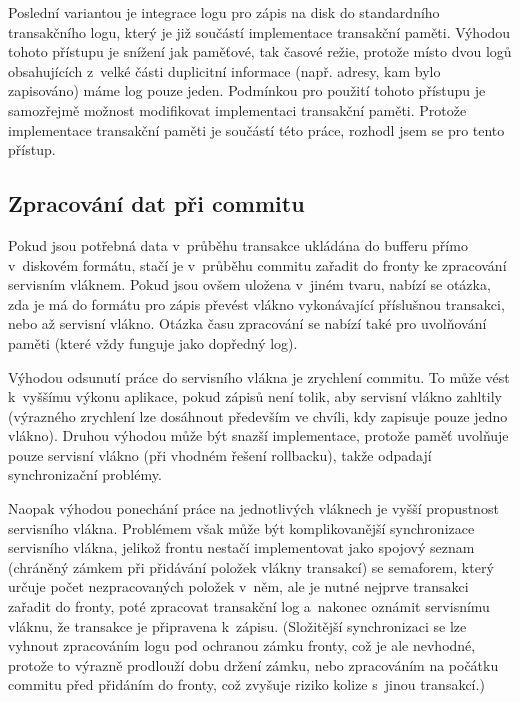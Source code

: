 Poslední variantou je integrace logu pro zápis na disk do standardního transakčního
logu, který je již součástí implementace transakční paměti. Výhodou tohoto přístupu
je snížení jak paměťové, tak časové režie, protože místo dvou logů obsahujících
z~velké části duplicitní informace (např. adresy, kam bylo zapisováno) máme log
pouze jeden. Podmínkou pro použití tohoto přístupu je samozřejmě možnost modifikovat
implementaci transakční paměti. Protože implementace transakční paměti je součástí
této práce, rozhodl jsem se pro tento přístup.

\subsection{Zpracování dat při commitu}
Pokud jsou potřebná data v~průběhu transakce ukládána do bufferu přímo v~diskovém
formátu, stačí je v~průběhu commitu zařadit do fronty ke zpracování servisním vláknem.
Pokud jsou ovšem uložena v~jiném tvaru, nabízí se otázka, zda je má do formátu
pro zápis převést vlákno vykonávající příslušnou transakci, nebo až servisní vlákno.
Otázka času zpracování se nabízí také pro uvolňování paměti (které vždy funguje
jako dopředný log).

Výhodou odsunutí práce do servisního vlákna je zrychlení commitu. To může vést k~vyššímu
výkonu aplikace, pokud zápisů není tolik, aby servisní vlákno zahltily (výrazného
zrychlení lze dosáhnout především ve chvíli, kdy zapisuje pouze jedno vlákno).
Druhou výhodou může být snazší implementace, protože paměť uvolňuje
pouze servisní vlákno (při vhodném řešení rollbacku), takže odpadají synchronizační
problémy.

Naopak výhodou ponechání práce na jednotlivých vláknech je vyšší propustnost servisního
vlákna. Problémem však může být komplikovanější synchronizace servisního vlákna,
jelikož frontu nestačí implementovat jako spojový seznam (chráněný zámkem při přidávání
položek vlákny transakcí) se semaforem, který určuje počet nezpracovaných položek v~něm,
ale je nutné nejprve transakci zařadit do fronty, poté zpracovat transakční log
a~nakonec oznámit servisnímu vláknu, že transakce je připravena k~zápisu.
(Složitější synchronizaci se lze vyhnout zpracováním logu pod ochranou zámku fronty,
což je ale nevhodné, protože to výrazně prodlouží dobu držení zámku, nebo zpracováním
na počátku commitu před přidáním do fronty, což zvyšuje riziko
kolize s~jinou transakcí.)



